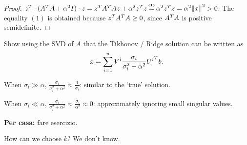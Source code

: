 \documentclass[computationalMathematics.tex]{subfiles}
\begin{document}
\begin{proof}
  $\tr{z} \cdot (\tr{A}A + \alpha^2 I) \cdot z = \tr{z}\tr{A}Az + \alpha^2 \tr{z} z  \numeq{(1)} \alpha^2 \tr{z} z = \alpha^2 \sqrnorm{x} > 0$. The equality $(1)$ is obtained because ${z}^{T}{A}^{T}A \ge 0$, since ${A}^{T}A$ is positive semidefinite. 
\end{proof}

\begin{exe}
Show using the SVD of $A$ that the Tikhonov / Ridge solution can be written as
\[
  x = \sum\limits_{i=1}^n V^i \frac{\sigma_i}{\sigma_i^2+\alpha^2} {U^i}^{T} b.
\]

When $\sigma_i \gg \alpha$, $\frac{\sigma_i}{\sigma_i^2+\alpha^2} \approx \frac{1}{\sigma_i}$: similar to the `true' solution.

When $\sigma_i \ll \alpha$, $\frac{\sigma_i}{\sigma_i^2+\alpha^2} \approx \frac{\sigma_i}{\alpha^2} \approx 0$: approximately ignoring small singular values.
\end{exe}
\textbf{Per casa:} fare esercizio.

How can we choose $k$? We don't know.
\end{document}
